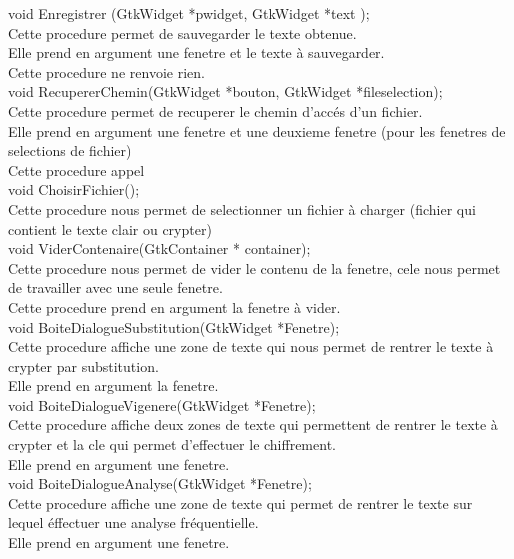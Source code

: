 \documentclass[a4]{article}
\begin{document}
	void Enregistrer (GtkWidget *pwidget, GtkWidget *text );\\
		Cette procedure permet de sauvegarder le texte obtenue.\\
		Elle prend en argument une fenetre et le texte à sauvegarder.\\
		Cette procedure ne renvoie rien.\\
	
	void RecupererChemin(GtkWidget *bouton, GtkWidget *fileselection);\\
		Cette procedure permet de recuperer le chemin d'accés d'un fichier.\\
		Elle prend en argument une fenetre et une deuxieme fenetre (pour les fenetres de selections de fichier)\\
		Cette procedure appel\\

	void ChoisirFichier();\\
		Cette procedure nous permet de selectionner un fichier à charger (fichier qui contient le texte clair ou crypter)\\

	void ViderContenaire(GtkContainer * container);\\
		Cette procedure nous permet de vider le contenu de la fenetre, cele nous permet de travailler avec une seule fenetre.\\
		Cette procedure prend en argument la fenetre à vider.\\
		
	void BoiteDialogueSubstitution(GtkWidget *Fenetre);\\
		Cette procedure affiche une zone de texte qui nous permet de rentrer le texte à crypter par substitution.\\
		Elle prend en argument la fenetre.\\
	
	void BoiteDialogueVigenere(GtkWidget *Fenetre);\\
		Cette procedure affiche deux zones de texte qui permettent de rentrer le texte à crypter et la cle qui permet d'effectuer le chiffrement.\\
		Elle prend en argument une fenetre.\\
		
	void BoiteDialogueAnalyse(GtkWidget *Fenetre);\\
		Cette procedure affiche une zone de texte qui permet de rentrer le texte sur lequel éffectuer une analyse fréquentielle.\\
		Elle prend en argument une fenetre.\\
		
\end{document}
